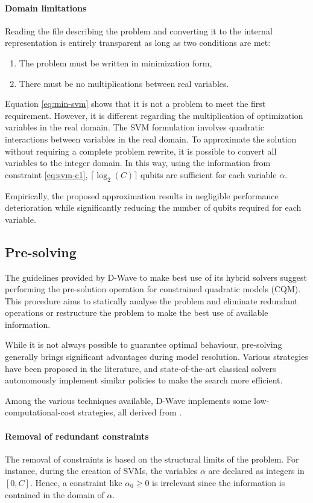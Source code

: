 \paragraph{Domain limitations}\label{sec:domain} Reading the file describing the problem and converting it to the internal representation is entirely transparent as long as two conditions are met:
\begin{enumerate}
    \item The problem must be written in minimization form,
    \item There must be no multiplications between real variables.
\end{enumerate}
Equation \ref{eq:min-svm} shows that it is not a problem to meet the first requirement. However, it is different regarding the multiplication of optimization variables in the real domain. The SVM formulation involves quadratic interactions between variables in the real domain. To approximate the solution without requiring a complete problem rewrite, it is possible to convert all variables to the integer domain. In this way, using the information from constraint \ref{eq:svm-c1}, $\lceil\log_2(C)\rceil$ qubits are sufficient for each variable $\alpha$.

Empirically, the proposed approximation results in negligible performance deterioration while significantly reducing the number of qubits required for each variable.

\subsection{Pre-solving}

The guidelines provided by D-Wave to make best use of its hybrid solvers suggest performing the pre-solution operation for constrained quadratic models (CQM). This procedure aims to statically analyse the problem and eliminate redundant operations or restructure the problem to make the best use of available information.

While it is not always possible to guarantee optimal behaviour, pre-solving generally brings significant advantages during model resolution. Various strategies have been proposed in the literature, and state-of-the-art classical solvers autonomously implement similar policies to make the search more efficient.

Among the various techniques available, D-Wave implements some low-computational-cost strategies, all derived from \cite{PRESOLVE}.

\paragraph{Removal of redundant constraints} The removal of constraints is based on the structural limits of the problem. For instance, during the creation of SVMs, the variables $\alpha$ are declared as integers in $[0, C]$. Hence, a constraint like $\alpha_0 \geq 0$ is irrelevant since the information is contained in the domain of $\alpha$.

